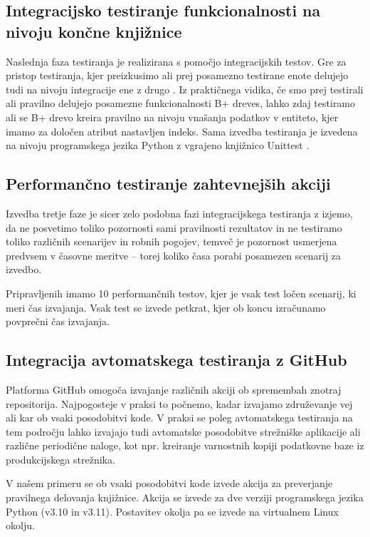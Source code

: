 \documentclass[a4paper,12pt,openright]{book}
\begin{document}
   \subsection{Integracijsko testiranje funkcionalnosti na nivoju končne knjižnice}

    Naslednja faza testiranja je realizirana s pomočjo integracijskih testov. Gre za pristop testiranja, kjer preizkusimo ali prej posamezno testirane enote delujejo tudi na nivoju integracije ene z drugo \cite{brar2015differentiating}. Iz praktičnega vidika, če smo prej testirali ali pravilno delujejo posamezne funkcionalnosti B+ dreves, lahko zdaj testiramo ali se B+ drevo kreira pravilno na nivoju vnašanja podatkov v entiteto, kjer imamo za določen atribut nastavljen indeks. Sama izvedba testiranja je izvedena na nivoju programskega jezika Python z vgrajeno knjižnico Unittest \cite{PY_UNITTEST}.
   
   \subsection{Performančno testiranje zahtevnejših akciji}

    Izvedba tretje faze je sicer zelo podobna fazi integracijskega testiranja z izjemo, da ne posvetimo toliko pozornosti sami pravilnosti rezultatov in ne testiramo toliko različnih scenarijev in robnih pogojev, temveč je pozornost usmerjena predvsem v časovne meritve – torej koliko časa porabi posamezen scenarij za izvedbo.

    Pripravljenih imamo 10 performančnih testov, kjer je vsak test ločen scenarij, ki meri čas izvajanja. Vsak test se izvede petkrat, kjer ob koncu izračunamo povprečni čas izvajanja.
   
   \subsection{Integracija avtomatskega testiranja z GitHub}

   Platforma GitHub omogoča izvajanje različnih akciji ob spremembah znotraj repositorija. Najpogosteje v praksi to počnemo, kadar izvajamo združevanje vej ali kar ob vsaki posodobitvi kode. V praksi se poleg avtomatskega testiranja na tem področju lahko izvajajo tudi avtomatske posodobitve strežniške aplikacije ali različne periodične naloge, kot npr. kreiranje varnostnih kopiji podatkovne baze iz produkcijskega strežnika.

   V našem primeru se ob vsaki posodobitvi kode izvede akcija za preverjanje pravilnega delovanja knjižnice. Akcija se izvede za dve verziji programskega jezika Python (v3.10 in v3.11). Postavitev okolja pa se izvede na virtualnem Linux okolju.
\end{document}
